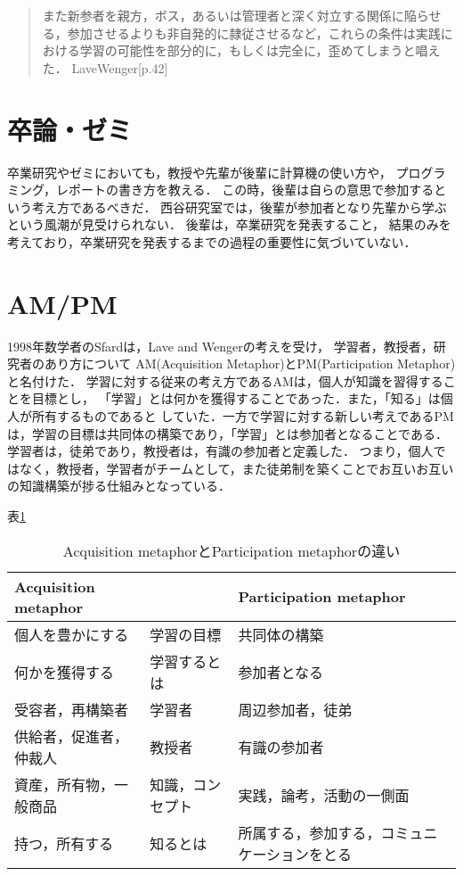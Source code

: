 \documentclass[a4,p11]{article}
\begin{document}
\begin{quote}
また新参者を親方，ボス，あるいは管理者と深く対立する関係に陥らせる，参加させるよりも非自発的に隷従させるなど，これらの条件は実践における学習の可能性を部分的に，もしくは完全に，歪めてしまうと唱えた．
  LaveWenger[p.42]
\end{quote}

\section{卒論・ゼミ}
\label{sec:org63de5d1}
卒業研究やゼミにおいても，教授や先輩が後輩に計算機の使い方や，
プログラミング，レポートの書き方を教える．
この時，後輩は自らの意思で参加するという考え方であるべきだ．
西谷研究室では，後輩が参加者となり先輩から学ぶという風潮が見受けられない．
後輩は，卒業研究を発表すること，
結果のみを考えており，卒業研究を発表するまでの過程の重要性に気づいていない．

\section{AM/PM}
\label{sec:orgfc08b41}

1998年数学者のSfardは，Lave and Wengerの考えを受け，
学習者，教授者，研究者のあり方について
AM(Acquisition Metaphor)とPM(Participation Metaphor)と名付けた．
学習に対する従来の考え方であるAMは，個人が知識を習得することを目標とし，
「学習」とは何かを獲得することであった．また，「知る」は個人が所有するものであると
していた．一方で学習に対する新しい考えであるPMは，学習の目標は共同体の構築であり，「学習」とは参加者となることである．学習者は，徒弟であり，教授者は，有識の参加者と定義した．
つまり，個人ではなく，教授者，学習者がチームとして，また徒弟制を築くことでお互いお互いの知識構築が捗る仕組みとなっている．

表\ref{tab:orgc686837}

\begin{table}[htbp]
\caption{\label{tab:orgc686837}
Acquisition metaphorとParticipation metaphorの違い}
\centering
\begin{tabular}{|l|l|l|}
\hline
Acquisition metaphor &  & Participation metaphor\\
\hline
個人を豊かにする & 学習の目標 & 共同体の構築\\
何かを獲得する & 学習するとは & 参加者となる\\
受容者，再構築者 & 学習者 & 周辺参加者，徒弟\\
供給者，促進者，仲裁人 & 教授者 & 有識の参加者\\
資産，所有物，一般商品 & 知識，コンセプト & 実践，論考，活動の一側面\\
持つ，所有する & 知るとは & 所属する，参加する，コミュニケーションをとる\\
\hline
\end{tabular}
\end{table}
\end{document}

